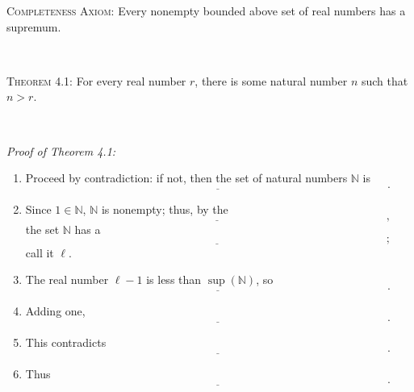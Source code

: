 \documentclass[12pt]{amsart}
\newcommand{\N}{\mathbb{N}}
\begin{document}
\newpage
\begin{framed}
\noindent \textsc{Completeness Axiom:} Every nonempty bounded above set of real numbers has a supremum.

\


\noindent \textsc{Theorem 4.1:} For every real number $r$, there is some natural number $n$ such that $n>r$.
\end{framed}

\

\noindent \textit{Proof of Theorem 4.1:}
\begin{enumerate}
\item Proceed by contradiction: if not, then the set of natural numbers $\N$ is 
\[ \underline{\phantom{ \qquad \qquad \qquad \qquad \qquad\qquad \qquad \qquad \qquad \qquad\qquad \qquad \qquad \qquad \qquad }}.\]
\item Since $1\in \N$, $\N$ is nonempty; thus, by the  
\[ \underline{\phantom{ \qquad\qquad \qquad \qquad \qquad\qquad \qquad \qquad \qquad \qquad\qquad \qquad \qquad \qquad \qquad }},\] the set $\N$ has a \[ \underline{\phantom{ \qquad \qquad \qquad \qquad \qquad\qquad \qquad \qquad \qquad \qquad \qquad \qquad \qquad  \qquad \qquad}};\] call it $\ell$.

\item The real number $\ell-1$ is less than $\sup(\N)$, so 
\[ \underline{\phantom{ \qquad\qquad \qquad \qquad \qquad\qquad \qquad \qquad \qquad \qquad\qquad \qquad \qquad \qquad \qquad }}.\]
\item Adding one, 
\[ \underline{\phantom{ \qquad\qquad \qquad \qquad \qquad\qquad \qquad \qquad \qquad \qquad\qquad \qquad \qquad \qquad \qquad }}.\]
\item This contradicts
\[ \underline{\phantom{ \qquad\qquad \qquad \qquad \qquad\qquad \qquad \qquad \qquad \qquad\qquad \qquad \qquad \qquad \qquad }}.\]
\item Thus
\[ \underline{\phantom{ \qquad\qquad \qquad \qquad \qquad\qquad \qquad \qquad \qquad \qquad\qquad \qquad \qquad \qquad \qquad }}.\]
\end{enumerate}
\end{document}
